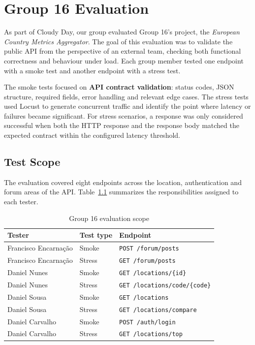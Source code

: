 \chapter{Group 16 Evaluation} \label{cap:tests}

As part of Cloudy Day, our group evaluated Group 16's project, the \textit{European Country Metrics Aggregator}. The goal of this evaluation was to validate the public API from the perspective of an external team, checking both functional correctness and behaviour under load. Each group member tested one endpoint with a smoke test and another endpoint with a stress test.

The smoke tests focused on \textbf{API contract validation}: status codes, JSON structure, required fields, error handling and relevant edge cases. The stress tests used Locust to generate concurrent traffic and identify the point where latency or failures became significant. For stress scenarios, a response was only considered successful when both the HTTP response and the response body matched the expected contract within the configured latency threshold.

\section{Test Scope}

The evaluation covered eight endpoints across the location, authentication and forum areas of the API. Table~\ref{tab:g16_scope} summarizes the responsibilities assigned to each tester.

\begin{table}[H]
    \centering
    \caption{Group 16 evaluation scope}
    \label{tab:g16_scope}
    \begin{tabular}{p{} p{} p{}}
        \hline
        \textbf{Tester} & \textbf{Test type} & \textbf{Endpoint} \\\hline
        Francisco Encarnação & Smoke & \texttt{POST /forum/posts} \\
        Francisco Encarnação & Stress & \texttt{GET /forum/posts} \\
        Daniel Nunes & Smoke & \texttt{GET /locations/\{id\}} \\
        Daniel Nunes & Stress & \texttt{GET /locations/code/\{code\}} \\
        Daniel Sousa & Smoke & \texttt{GET /locations} \\
        Daniel Sousa & Stress & \texttt{GET /locations/compare} \\
        Daniel Carvalho & Smoke & \texttt{POST /auth/login} \\
        Daniel Carvalho & Stress & \texttt{GET /locations/top} \\\hline
    \end{tabular}
\end{table}

